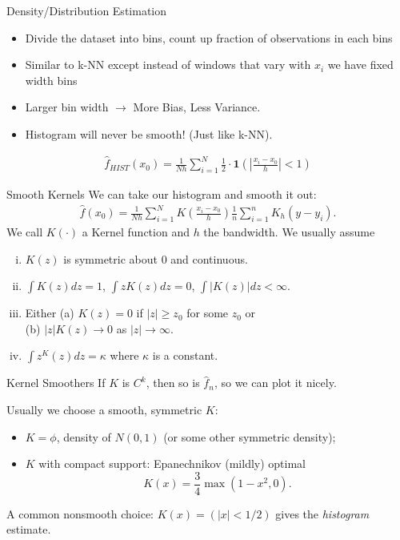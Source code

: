 \documentclass[11pt,handout,xcolor=pdftex,dvipsnames,table,mathserif,aspectratio=169]{beamer}
\begin{document}
\begin{frame}{Density/Distribution Estimation}
\begin{itemize}
\item Divide the dataset into bins, count up fraction of observations in each bins
\item Similar to k-NN except instead of windows that vary with $x_i$ we have fixed width bins
\item Larger bin width $\rightarrow$ More Bias, Less Variance.
\item Histogram will never be smooth! (Just like k-NN).
\end{itemize}
\begin{eqnarray*}
\hat{f}_{HIST}(x_0) = \frac{1}{Nh} \sum_{i=1}^N  \frac{1}{2} \cdot \mathbf{1} \left (\left|\frac{x_i - x_0}{h} \right| < 1 \right)
\end{eqnarray*}
\end{frame}




\begin{frame}{Smooth Kernels}
We can take our histogram and smooth it out:
\begin{eqnarray*}
\hat{f}(x_0) = \frac{1}{Nh} \sum_{i=1}^N  K  \left(\frac{x_i - x_0}{h} \right)  \frac{1}{n}\sum_{i=1}^n K_h\left(
y-y_i\right).
\end{eqnarray*}
We call $K(\cdot)$ a \alert{Kernel function} and $h$ the \alert{bandwidth}. We usually assume
\begin{enumerate}[(i)]
\item $K(z)$ is symmetric about $0$ and continuous.
\item $\int K(z) d z = 1$,  $\int z K(z) d z = 0$,  $\int |K(z)| d z < \infty$.
\item Either (a) $K(z) = 0$ if $|z| \geq z_0$ for some $z_0$ or \\
(b) $|z| K(z) \rightarrow 0$ as $|z| \rightarrow \infty$.
\item $\int z^ K(z) d z = \kappa$ where $\kappa$ is a constant.
\end{enumerate}
\end{frame}

\begin{frame}{Kernel Smoothers}
If $K$ is $C^k$, then so is ${\hat f}_n$, so we can plot it nicely.

\pause

Usually we choose a smooth, symmetric $K$:



\pause




\begin{itemize}[<+->]
\item $K=\phi$, density of $N(0,1)$ (or some other symmetric density);
\item $K$ with compact support: Epanechnikov (mildly) optimal
\[
K(x)= \frac{3}{4} \max(1-x^2,0).
\]
\end{itemize}
\pause
A common nonsmooth choice: $K(x)=(|x|<1/2)$ gives the {\em histogram}
estimate.
\end{frame}
\end{document}
